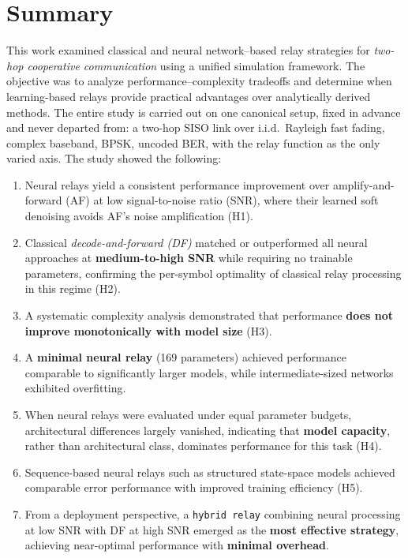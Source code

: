\chapter {Summary}
\noindent
This work examined classical and neural network–based relay strategies for \textit{two-hop cooperative communication} using a unified simulation framework. The objective was to analyze performance–complexity tradeoffs and determine when learning-based relays provide practical advantages over analytically derived methods.
The entire study is carried out on one canonical setup, fixed in advance and never departed from: a two-hop SISO link over i.i.d.\ Rayleigh fast fading, complex baseband, BPSK, uncoded BER, with the relay function as the only varied axis. The study showed the following:
\begin{enumerate}
    \item Neural relays yield a consistent performance improvement over amplify-and-forward (AF) at low signal-to-noise ratio (SNR), where their learned soft denoising avoids AF's noise amplification (H1).
    \item Classical \textit{decode-and-forward (DF)} matched or outperformed all neural approaches at \textbf{medium-to-high SNR} while requiring no trainable parameters, confirming the per-symbol optimality of classical relay processing in this regime (H2).
    \item A systematic complexity analysis demonstrated that performance \textbf{does not improve monotonically with model size} (H3).
    \item A \textbf{minimal neural relay} (169 parameters) achieved performance comparable to significantly larger models, while intermediate-sized networks exhibited overfitting.
    \item When neural relays were evaluated under equal parameter budgets, architectural differences largely vanished, indicating that \textbf{model capacity}, rather than architectural class, dominates performance for this task (H4).
    \item Sequence-based neural relays such as structured state-space models achieved comparable error performance with improved training efficiency (H5).
    \item From a deployment perspective, a \texttt{hybrid relay} combining neural processing at low SNR with DF at high SNR emerged as the \textbf{most effective strategy}, achieving near-optimal performance with \textbf{minimal overhead}.

\end{enumerate}
